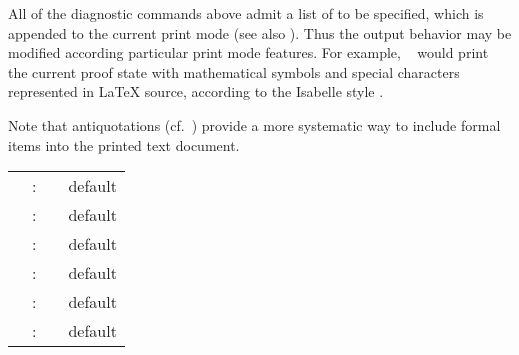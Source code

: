 \begin{isabellebody}
\begin{isamarkuptext}
\begin{description}
  \end{description}

  All of the diagnostic commands above admit a list of 
  to be specified, which is appended to the current print mode (see
  also \cite{isabelle-ref}).  Thus the output behavior may be modified
  according particular print mode features.  For example, \hyperlink{command.pr}{\mbox{}}~ would print the current proof state
  with mathematical symbols and special characters represented in
  {\LaTeX} source, according to the Isabelle style
  \cite{isabelle-sys}.

  Note that antiquotations (cf.\ ) provide a more
  systematic way to include formal items into the printed text
  document.%
\end{isamarkuptext}%
\isamarkuptrue%
%
\isamarkuptrue%
%
\begin{isamarkuptext}%
\begin{tabular}{rcll}
    \indexdef{}{attribute}{show\_types}\hypertarget{attribute.show-types}{\hyperlink{attribute.show-types}{\mbox{\isa{show{\isaliteral{5F}{\isacharunderscore}}types}}}} & : & \isa{attribute} & default \isa{false} \\
    \indexdef{}{attribute}{show\_sorts}\hypertarget{attribute.show-sorts}{\hyperlink{attribute.show-sorts}{\mbox{\isa{show{\isaliteral{5F}{\isacharunderscore}}sorts}}}} & : & \isa{attribute} & default \isa{false} \\
    \indexdef{}{attribute}{show\_consts}\hypertarget{attribute.show-consts}{\hyperlink{attribute.show-consts}{\mbox{\isa{show{\isaliteral{5F}{\isacharunderscore}}consts}}}} & : & \isa{attribute} & default \isa{false} \\
    \indexdef{}{attribute}{show\_abbrevs}\hypertarget{attribute.show-abbrevs}{\hyperlink{attribute.show-abbrevs}{\mbox{\isa{show{\isaliteral{5F}{\isacharunderscore}}abbrevs}}}} & : & \isa{attribute} & default \isa{true} \\
    \indexdef{}{attribute}{show\_brackets}\hypertarget{attribute.show-brackets}{\hyperlink{attribute.show-brackets}{\mbox{\isa{show{\isaliteral{5F}{\isacharunderscore}}brackets}}}} & : & \isa{attribute} & default \isa{false} \\
    \indexdef{}{attribute}{long\_names}\hypertarget{attribute.long-names}{\hyperlink{attribute.long-names}{\mbox{\isa{long{\isaliteral{5F}{\isacharunderscore}}names}}}} & : & \isa{attribute} & default \isa{false} \\

\end{tabular}
\end{isamarkuptext}
\end{isabellebody}
